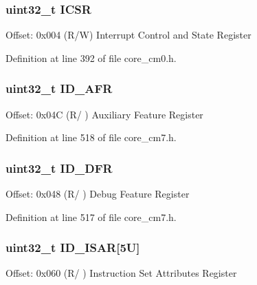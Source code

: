\subsubsection[{\texorpdfstring{I\+C\+SR}{ICSR}}]{ uint32\+\_\+t I\+C\+SR}\hypertarget{struct_s_c_b___type_aced895d6aba03d72b0d865fcc5ce44ee}{}\label{struct_s_c_b___type_aced895d6aba03d72b0d865fcc5ce44ee}
Offset\+: 0x004 (R/W) Interrupt Control and State Register 

Definition at line 392 of file core\+\_\+cm0.\+h.

\subsubsection[{\texorpdfstring{I\+D\+\_\+\+A\+FR}{ID_AFR}}]{ uint32\+\_\+t I\+D\+\_\+\+A\+FR}\hypertarget{struct_s_c_b___type_a70c88751f9ace03b5ca3e364c65b9617}{}\label{struct_s_c_b___type_a70c88751f9ace03b5ca3e364c65b9617}
Offset\+: 0x04C (R/ ) Auxiliary Feature Register 

Definition at line 518 of file core\+\_\+cm7.\+h.

\subsubsection[{\texorpdfstring{I\+D\+\_\+\+D\+FR}{ID_DFR}}]{ uint32\+\_\+t I\+D\+\_\+\+D\+FR}\hypertarget{struct_s_c_b___type_a883f7e28417c51d3a3bf03185baf448f}{}\label{struct_s_c_b___type_a883f7e28417c51d3a3bf03185baf448f}
Offset\+: 0x048 (R/ ) Debug Feature Register 

Definition at line 517 of file core\+\_\+cm7.\+h.

\subsubsection[{\texorpdfstring{I\+D\+\_\+\+I\+S\+AR}{ID_ISAR}}]{ uint32\+\_\+t I\+D\+\_\+\+I\+S\+AR\mbox{[}5\+U\mbox{]}}\hypertarget{struct_s_c_b___type_a966bd8b1d3dd6ab85b5db9b435f6fc1f}{}\label{struct_s_c_b___type_a966bd8b1d3dd6ab85b5db9b435f6fc1f}
Offset\+: 0x060 (R/ ) Instruction Set Attributes Register 

